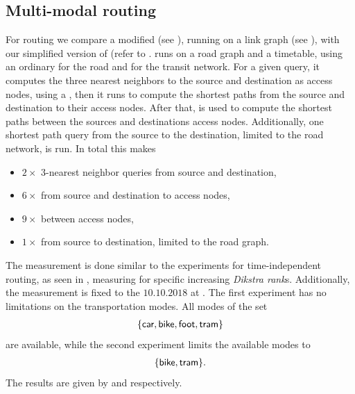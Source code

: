 \subsection{Multi-modal routing}
	For \multiModal routing we compare a modified \dijkstra (see ), running on a link graph (see ), with
	our simplified version of \anr (refer to . \anr runs on a road graph and a timetable, using an ordinary \dijkstra for the road
	and \csa for the transit network. For a given query, it computes the three nearest neighbors to the source and destination as access nodes,
	using a \coverTree, then it runs \dijkstra to compute the shortest paths from the source and destination to their access nodes. After that, \csa is
	used to compute the shortest paths between the sources and destinations access nodes. Additionally, one shortest path query from the source
	to the destination, limited to the road network, is run. In total this makes
	\begin{itemize}
		\item[] $2 \times$ $3$-nearest neighbor queries from source and destination,
		\item[] $6 \times$ \dijkstra from source and destination to access nodes,
		\item[] $9 \times$ \csa between access nodes,
		\item[] $1 \times$ \dijkstra from source to destination, limited to the road graph.
	\end{itemize}
	The measurement is done similar to the experiments for \uniModal time-independent routing, as seen
	in , measuring for specific increasing \textit{Dikstra rank}s. Additionally, the measurement is fixed
	to the $10.10.2018$ at . The first experiment has no limitations on the transportation modes. All modes of the set
	\begin{align*}
		\{\textsf{car}, \textsf{bike}, \textsf{foot}, \textsf{tram}\}
	\end{align*}
	are available, while the second experiment limits the available modes to
	\begin{align*}
		\{\textsf{bike}, \textsf{tram}\}.
	\end{align*}
	The results are given by  and  respectively.\\
